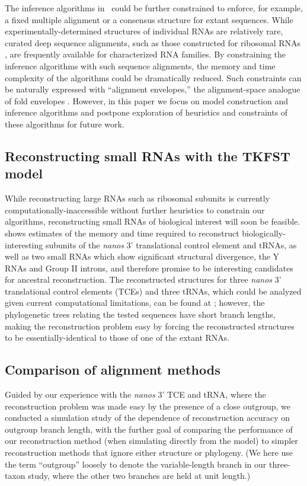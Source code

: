 \documentclass[10pt]{article}
\begin{document}
The inference algorithms in \indiegram\ could be further constrained
to enforce, for example, a fixed multiple alignment or a consensus
structure for extant sequences.  While experimentally-determined
structures of individual RNAs are relatively rare, curated deep sequence
alignments, such as those constructed for ribosomal RNAs
\cite{Gutell93}, are frequently available for characterized RNA families.  By constraining the
inference algorithms with such sequence alignments, the memory and
time complexity of the algorithms could be dramatically reduced.  Such
constraints can be naturally expressed with ``alignment envelopes,''
the alignment-space analogue of fold envelopes \cite{Holmes2005}.
However, in this paper we focus on model construction and inference
algorithms and postpone exploration of heuristics and constraints of
these algorithms for future work.


\subsection*{Reconstructing small RNAs with the TKFST model}

While reconstructing large RNAs such as ribosomal subunits is
currently computationally-inaccessible without further heuristics to
constrain our algorithms, reconstructing small RNAs of biological
interest will soon be feasible.
 shows estimates of the memory and time required
to reconstruct biologically-interesting subunits of 
the \emph{nanos} 3' translational control element and tRNAs,
as well as two small RNAs which show significant structural
divergence, the Y RNAs and Group II introns, and therefore promise to be
interesting candidates for ancestral reconstruction.
The reconstructed structures for three \emph{nanos} 3'
translational control elements (TCEs) and three tRNAs, which could be
analyzed given current computational limitations, can be found at
\indiegramurl; however, the phylogenetic trees relating the tested
sequences have short branch lengths, making the reconstruction problem easy by forcing the reconstructed structures to
be essentially-identical to those of one of the extant RNAs.


\subsection*{Comparison of alignment methods}

Guided by our experience with the \emph{nanos} 3' TCE and tRNA, where
the reconstruction problem was made easy by the presence of a close
outgroup, we conducted a simulation study of the dependence of reconstruction accuracy on outgroup branch length,
with the further goal of comparing the performance of our reconstruction method (when simulating directly from the model)
to simpler reconstruction methods that ignore either structure or phylogeny.
(We here use the term ``outgroup'' loosely to denote the
variable-length branch in our three-taxon study,
where the other two branches are held at unit length.)
\end{document}
